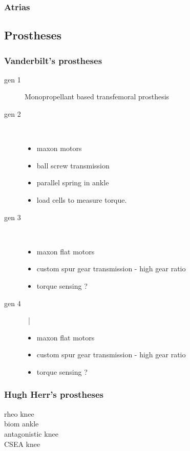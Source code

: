 \subsubsection{Atrias}

\subsection{Prostheses}
\subsubsection{Vanderbilt's prostheses}
    \begin{description}
        \item[gen 1] Monopropellant based transfemoral prosthesis
        \item[gen 2] \phantom{text} ~\\
        \begin{itemize}
                \item maxon motors
                \item ball screw transmission
                \item parallel spring in ankle
                \item load cells to measure torque.
            \end{itemize}
        \item[gen 3] ~\\
            \begin{itemize}
                \item maxon flat motors
                \item custom spur gear transmission - high gear ratio
                \item torque sensing ?
            \end{itemize}
        \item[gen 4] ~|\
            \begin{itemize}
                \item maxon flat motors
                \item custom spur gear transmission - high gear ratio
                \item torque sensing ?
            \end{itemize}
    \end{description}
\subsubsection{Hugh Herr's prostheses}
    \begin{description}
        \item[rheo knee]
        \item[biom ankle]
        \item[antagonistic knee]
        \item[CSEA knee]
    \end{description}
